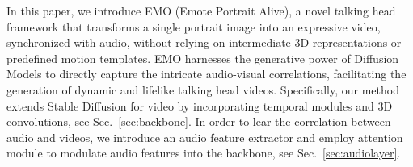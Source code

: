 \documentclass[runningheads]{llncs}
\begin{document}
In this paper, we introduce EMO (Emote Portrait Alive), a novel talking head framework that transforms a single portrait image into an expressive video, synchronized with audio, without relying on intermediate 3D representations or predefined motion templates. 
EMO harnesses the generative power of Diffusion Models to directly capture the intricate audio-visual correlations, facilitating the generation of dynamic and lifelike talking head videos.
Specifically, our method extends Stable Diffusion for video by incorporating temporal modules and 3D convolutions, see Sec.~\ref{sec:backbone}. 
In order to lear the correlation between audio and videos, we introduce an audio feature extractor and employ attention module to modulate audio features into the backbone, see Sec.~\ref{sec:audiolayer}.
\end{document}
